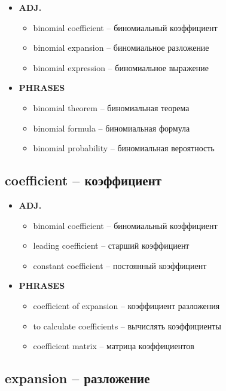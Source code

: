 \documentclass[a4paper, 10pt]{article}
\theoremstyle{definition}
\theoremstyle{plain}
\theoremstyle{remark}
\begin{document}
\begin{itemize}
    \item \textbf{ADJ.}
    \begin{itemize}
        \item binomial coefficient – биномиальный коэффициент
        \item binomial expansion – биномиальное разложение
        \item binomial expression – биномиальное выражение
    \end{itemize}
    
    \item \textbf{PHRASES}
    \begin{itemize}
        \item binomial theorem – биномиальная теорема
        \item binomial formula – биномиальная формула
        \item binomial probability – биномиальная вероятность
    \end{itemize}
\end{itemize}

\subsection{coefficient – коэффициент}

\begin{itemize}
    \item \textbf{ADJ.}
    \begin{itemize}
        \item binomial coefficient – биномиальный коэффициент
        \item leading coefficient – старший коэффициент
        \item constant coefficient – постоянный коэффициент
    \end{itemize}
    
    \item \textbf{PHRASES}
    \begin{itemize}
        \item coefficient of expansion – коэффициент разложения
        \item to calculate coefficients – вычислять коэффициенты
        \item coefficient matrix – матрица коэффициентов
    \end{itemize}
\end{itemize}

\subsection{expansion – разложение}
\end{document}
